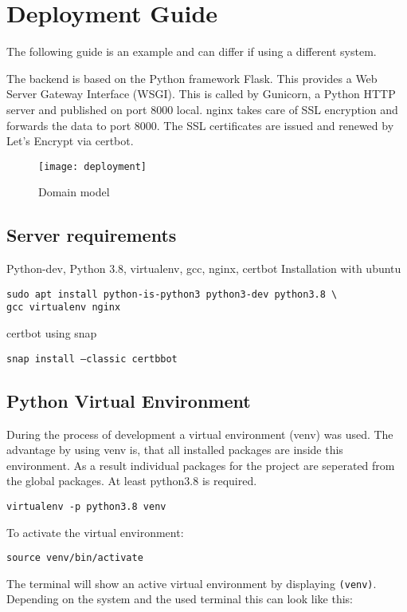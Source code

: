 \author{Paul Hoffmann}
\graphicspath{ {./src/chapters/developer/media/} }

\chapter{Deployment Guide}
The following guide is an example and can differ if using a different system.

The backend is based on the Python framework Flask.
This provides a Web Server Gateway Interface (WSGI).
This is called by Gunicorn, a Python HTTP server and published on port 8000 local.
nginx takes care of SSL encryption and forwards the data to port 8000.
The SSL certificates are issued and renewed by Let's Encrypt via certbot.

\begin{figure}[htb]
    \centering
    \texttt{[image: deployment]}
    \caption{Domain model}
\end{figure}


\section{Server requirements}
Python-dev, Python 3.8, virtualenv, gcc, nginx, certbot Installation with ubuntu

\texttt{sudo apt install python-is-python3 python3-dev python3.8 \textbackslash \\gcc virtualenv nginx}

certbot using snap

\texttt{snap install --classic certbbot}

\section{Python Virtual Environment}
During the process of development a virtual environment (venv) was used.
The advantage by using venv is, that all installed packages are inside this environment.
As a result individual packages for the project are seperated from the global packages.
At least python3.8 is required.

\texttt{virtualenv -p python3.8 venv}

To activate the virtual environment:

\texttt{source venv/bin/activate}

The terminal will show an active virtual environment by displaying \texttt{(venv)}.
Depending on the system and the used terminal this can look like this:

